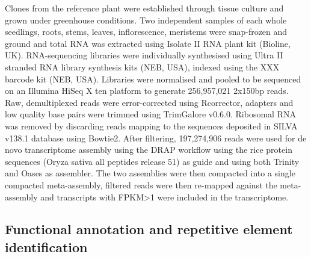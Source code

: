 Clones from the reference plant were established through tissue culture
and grown under greenhouse conditions. Two independent samples of each
whole seedlings, roots, stems, leaves, inflorescence, meristems were
snap-frozen and ground and total RNA was extracted using Isolate II RNA
plant kit (Bioline, UK). RNA-sequencing libraries were individually
synthesised using Ultra II stranded RNA library synthesis kits (NEB,
USA), indexed using the XXX barcode kit (NEB, USA). Libraries were
normalised and pooled to be sequenced on an Illumina HiSeq X ten
platform to generate 256,957,021 2x150bp reads. Raw, demultiplexed reads
were error-corrected using Rcorrector, adapters and low quality base
pairs were trimmed using TrimGalore v0.6.0. Ribosomal RNA was removed by
discarding reads mapping to the sequences deposited in SILVA v138.1
database using Bowtie2. After filtering, 197,274,906 reads were used for
de novo transcriptome assembly using the DRAP workflow using the rice
protein sequences (Oryza sativa all peptides release 51) as guide and
using both Trinity and Oases as assembler. The two assemblies were then
compacted into a single compacted meta-assembly, filtered reads were
then re-mapped against the meta-assembly and transcripts with
FPKM\textgreater1 were included in the transcriptome.

\hypertarget{functional-annotation-and-repetitive-element-identification}{%
\subsection{Functional annotation and repetitive element
identification}\label{functional-annotation-and-repetitive-element-identification}}

